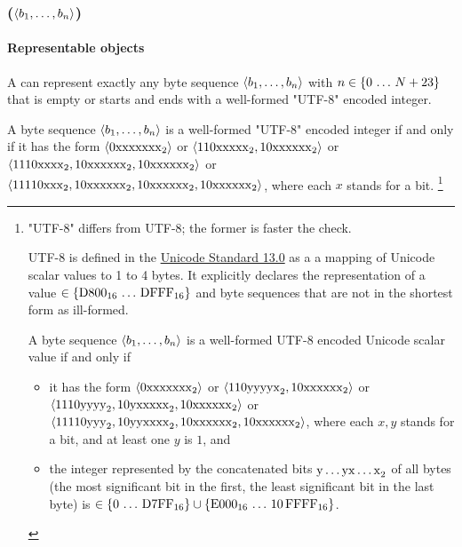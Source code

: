 \subsubsection{($\langle b_1, \ldots, b_n \rangle$)}
\hypertarget{sec:def:Utf8StringValue}{}

\paragraph{Representable objects}

A  can represent exactly any byte sequence $\langle b_1, \ldots, b_n \rangle$
with $n \in \{0 \,\ldots\, N + 23\}$ that is empty or starts and ends with a well-formed "UTF-8" encoded integer.

A byte sequence $\langle b_1, \ldots, b_n \rangle$ is a well-formed "UTF-8" encoded integer if and only if
it has the form
$\langle \mathrm{0xxxxxxx}_{2} \rangle$ or
$\langle \mathrm{110xxxxx}_{2}, \mathrm{10xxxxxx}_{2} \rangle$ or
$\langle \mathrm{1110xxxx}_{2}, \mathrm{10xxxxxx}_{2}, \mathrm{10xxxxxx}_{2} \rangle$ or
$\langle \mathrm{11110xxx}_{2}, \mathrm{10xxxxxx}_{2}, \mathrm{10xxxxxx}_{2}, \mathrm{10xxxxxx}_{2} \rangle$,
where each $x$ stands for a bit.%
\footnote{
    "UTF-8" differs from UTF-8; the former is faster the check.

    UTF-8 is defined in the
    \href{https://www.unicode.org/versions/Unicode13.0.0/ch03.pdf\#G31703}{Unicode Standard 13.0}
    as a a mapping of Unicode scalar values to 1 to 4 bytes.
    It explicitly declares the representation of a value $\in \{\mathrm{D800}_{16} \,\ldots\, \mathrm{DFFF}_{16}\}$
    and byte sequences that are not in the shortest form as ill-formed.

    A byte sequence $\langle b_1, \ldots, b_n \rangle$ is a well-formed UTF-8 encoded Unicode scalar value if and
    only if
    \begin{itemize}
        \item
        it has the form
        $\langle \mathrm{0xxxxxxx}_{2} \rangle$ or
        $\langle \mathrm{110yyyyx}_{2}, \mathrm{10xxxxxx}_{2} \rangle$ or
        $\langle \mathrm{1110yyyy}_{2}, \mathrm{10yxxxxx}_{2}, \mathrm{10xxxxxx}_{2} \rangle$ or
        $\langle \mathrm{11110yyy}_{2}, \mathrm{10yyxxxx}_{2}, \mathrm{10xxxxxx}_{2}, \mathrm{10xxxxxx}_{2} \rangle$,
        where each $x, y$ stands for a bit, and at least one $y$ is $1$, and

        \item
        the integer represented by the concatenated bits $\mathrm{y \ldots y x \ldots x}_{2}$ of all bytes
        (the most significant bit in the first, the least significant bit in the last byte) is
        $\in \{0 \,\ldots\, \mathrm{D7FF}_{16}\} \cup \{\mathrm{E000}_{16} \,\ldots\, \mathrm{10\,FFFF}_{16}\}$.
    \end{itemize}
}

